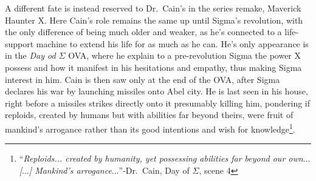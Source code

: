 A different fate is instead reserved to Dr.~Cain's in the series remake, Maverick Haunter X. Here Cain's role remains the same up until Sigma's revolution, with the only difference of being much older and weaker, as he's connected to a life-support machine to extend his life for as much as he can. He's only appearance is in the \emph{Day od $\Sigma$} OVA, where he explain to a pre-revolution Sigma the power X possess and how it manifest in his hesitations and empathy, thus making Sigma interest in him. Cain is then saw only at the end of the OVA, after Sigma declares his war by launching missiles onto Abel city. He is last seen in his house, right before a missiles strikes directly onto it presumably killing him, pondering if reploids, created by humans but with abilities far beyond theirs, were fruit of mankind's arrogance rather than its good intentions and wish for knowledge\footnote{``\textit{Reploids... created by humanity, yet possessing abilities far beyond our own$\dots$ [$\dots$] Mankind's arrogance$\dots$}''-Dr.~Cain, Day of $\Sigma$, scene 4}.

